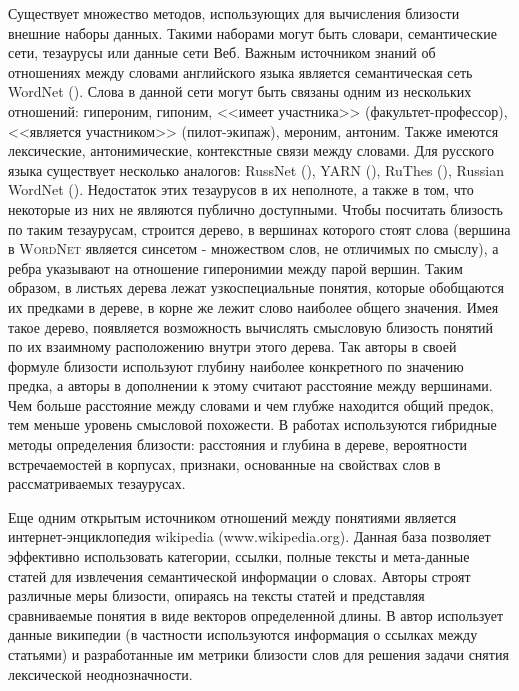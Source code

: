 Существует множество методов, использующих для вычисления близости внешние наборы данных. Такими наборами могут быть словари, семантические сети, тезаурусы или данные сети Веб. Важным источником знаний об отношениях между словами английского языка является семантическая сеть WordNet (\cite{wordnet}). Слова в данной сети могут быть связаны одним из нескольких отношений: гипероним, гипоним, <<имеет участника>> (факультет-профессор), <<является участником>> (пилот-экипаж), мероним, антоним. Также имеются лексические, антонимические, контекстные связи между словами. Для русского языка существует несколько аналогов: RussNet (\cite{russnet}), YARN (\cite{yarn, yarn_2}), RuThes (\cite{ruthes}), Russian WordNet (\cite{russian_wordnet}). Недостаток этих тезаурусов в их неполноте, а также в том, что некоторые из них не являются публично доступными. Чтобы посчитать близость по таким тезаурусам, строится дерево, в вершинах которого стоят слова (вершина в \textsc{WordNet} является синсетом - множеством слов, не отличимых по смыслу), а ребра указывают на отношение гиперонимии между парой вершин. Таким образом, в листьях дерева лежат узкоспециальные понятия, которые обобщаются их предками в дереве, в корне же лежит слово наиболее общего значения. Имея такое дерево, появляется возможность вычислять смысловую близость понятий по их взаимному расположению внутри этого дерева. Так авторы \cite{wordnet_sim_0} в своей формуле близости используют глубину наиболее конкретного по значению предка, а авторы  \cite{wordnet_sim_1} в дополнении к этому считают расстояние между вершинами. Чем больше расстояние между словами и чем глубже находится общий предок, тем меньше уровень смысловой похожести. В работах \cite{wordnet_hybrid_1,wordnet_hybrid_2} используются гибридные методы определения близости: расстояния и глубина в дереве, вероятности встречаемостей в корпусах, признаки, основанные на свойствах слов в рассматриваемых тезаурусах.

Еще одним открытым источником отношений между понятиями является интернет-энциклопедия wikipedia (www.wikipedia.org). Данная база позволяет эффективно использовать категории, ссылки, полные тексты и мета-данные статей для извлечения семантической информации о словах. Авторы \cite{wiki} строят различные меры близости, опираясь на тексты статей и представляя сравниваемые понятия в виде векторов определенной длины. В \cite{wiki_2} автор использует данные википедии (в частности используются информация о ссылках между статьями) и разработанные им метрики близости слов для решения задачи снятия лексической неоднозначности. 

